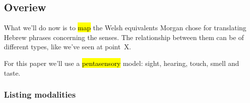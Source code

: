 \setcounter{subsection}{-1}
\subsection[Overview]{Overiew}

\begin{paper}


	What we’ll do now is to \hl{map} the Welsh equivalents Morgan chose for translating Hebrew phrases concerning the senses. The relationship between them can be of different types, like we’ve seen at point~X.

	For this paper we’ll use a \hl{pentasensory} model:  sight, hearing, touch, smell and taste.
\end{paper}




\subsubsection{Listing modalities}

